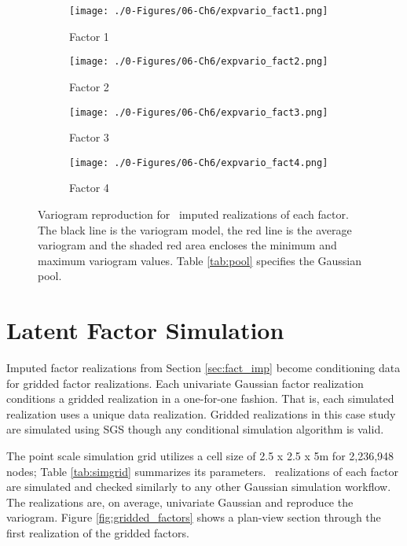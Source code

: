 \begin{figure}
    \begin{subfigure}{1.0\textwidth}
        \centering
        \texttt{[image: ./0-Figures/06-Ch6/expvario\_fact1.png]}
        \caption{Factor 1}
    \end{subfigure}
    \begin{subfigure}{1.0\textwidth}
        \centering
        \texttt{[image: ./0-Figures/06-Ch6/expvario\_fact2.png]}
        \caption{Factor 2}
    \end{subfigure}
    \begin{subfigure}{1.0\textwidth}
        \centering
        \texttt{[image: ./0-Figures/06-Ch6/expvario\_fact3.png]}
        \caption{Factor 3}
    \end{subfigure}
    \begin{subfigure}{1.0\textwidth}
        \centering
        \texttt{[image: ./0-Figures/06-Ch6/expvario\_fact4.png]}
        \caption{Factor 4}
    \end{subfigure}
    \caption{Variogram reproduction for \csnreals \ imputed realizations of each factor. The black line is the variogram model, the red line is the average variogram and the shaded red area encloses the minimum and maximum variogram values. Table \ref{tab:pool} specifies the Gaussian pool.}
    \label{fig:nmrimp_repro_gvario}
\end{figure}


\FloatBarrier
\section{Latent Factor Simulation}
\label{sec:fact_sim}

Imputed factor realizations from Section \ref{sec:fact_imp} become conditioning data for gridded factor realizations. Each univariate Gaussian factor realization conditions a gridded realization in a one-for-one fashion. That is, each simulated realization uses a unique data realization. Gridded realizations in this case study are simulated using \gls{SGS} though any conditional simulation algorithm is valid.

The point scale simulation grid utilizes a cell size of 2.5 x 2.5 x 5m for 2,236,948 nodes; Table \ref{tab:simgrid} summarizes its parameters. \csnreals \ realizations of each factor are simulated and checked similarly to any other Gaussian simulation workflow. The realizations are, on average, univariate Gaussian and reproduce the variogram. Figure \ref{fig:gridded_factors} shows a plan-view section through the first realization of the gridded factors.

